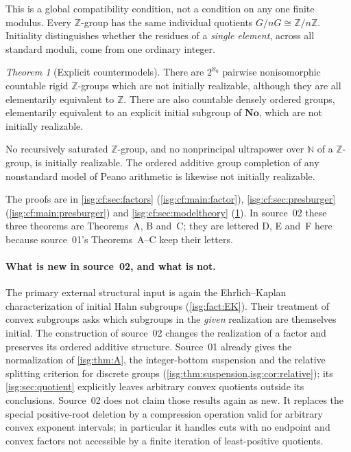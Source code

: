 \documentclass[11pt]{article}
\theoremstyle{definition}
\theoremstyle{remark}
\newtheorem{maintheorem}{Theorem}
\newcommand{\No}{\ensuremath{\mathbf{No}}}
\newcommand{\Z}{\mathbb{Z}}
\newcommand{\N}{\mathbb{N}}
\begin{document}
This is a global compatibility condition, not a condition on any one
finite modulus. Every $\Z$-group has the same individual quotients
$G/nG\cong\Z/n\Z$. Initiality distinguishes whether the residues of a
\emph{single element}, across all standard moduli, come from one ordinary
integer.

\begin{maintheorem}[Explicit countermodels]\label{isg:cf:main:models}
There are $2^{\aleph_0}$ pairwise nonisomorphic countable rigid
$\Z$-groups which are not initially realizable, although they are all
elementarily equivalent to $\Z$. There are also countable densely
ordered groups, elementarily equivalent to an explicit initial subgroup
of $\No$, which are not initially realizable.

No recursively saturated $\Z$-group, and no nonprincipal ultrapower over
$\N$ of a $\Z$-group, is initially realizable. The ordered additive group
completion of any nonstandard model of Peano arithmetic is likewise not
initially realizable.
\end{maintheorem}

The proofs are in \cref{isg:cf:sec:factors} (\cref{isg:cf:main:factor}),
\cref{isg:cf:sec:presburger} (\cref{isg:cf:main:presburger}) and
\cref{isg:cf:sec:modeltheory} (\cref{isg:cf:main:models}). In source~02
these three theorems are Theorems~A, B and~C; they are lettered D, E
and~F here because source~01's Theorems~A--C keep their letters.

\paragraph{What is new in source~02, and what is not.} The primary external
structural input is again the Ehrlich--Kaplan characterization of initial
Hahn subgroups (\cref{isg:fact:EK}). Their treatment of convex subgroups
asks which subgroups in the \emph{given} realization are themselves
initial. The construction of source~02 changes the realization of a
factor and preserves its ordered additive structure. Source~01 already
gives the normalization of \cref{isg:thm:A}, the integer-bottom suspension
and the relative splitting criterion for discrete groups
(\cref{isg:thm:suspension,isg:cor:relative}); its \cref{isg:sec:quotient}
explicitly leaves arbitrary convex quotients outside its conclusions.
Source~02 does not claim those results again as new. It replaces the
special positive-root deletion by a compression operation valid for
arbitrary convex exponent intervals; in particular it handles cuts with no
endpoint and convex factors not accessible by a finite iteration of
least-positive quotients.
\end{document}
